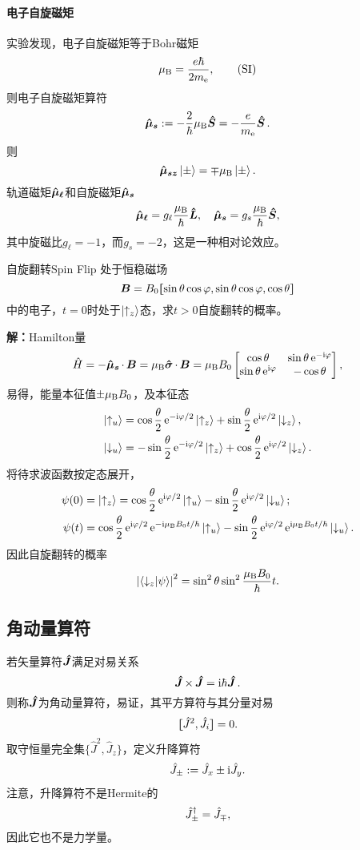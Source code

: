 \paragraph*{电子自旋磁矩}实验发现，电子自旋磁矩等于Bohr磁矩
\[
	\muB=\frac{e\hbar}{2m_\elc},\lSI
\]
则电子自旋磁矩算符
\[
	\qo{\mu_s}:=-\frac2\hbar\muB\qo S=-\frac e{m_\elc}\qo S.
\]
则
\[
	\qo{\mu_{sz}}\ket\pm=\mp\muB\ket\pm.
\]
轨道磁矩$\qo{\mu_\ell}$和自旋磁矩$\qo{\mu_s}$
\[
	\qo{\mu_\ell}=g_\ell\frac\muB\hbar\qo L,\quad\qo{\mu_s}=g_s\frac\muB\hbar\qo S,
\]
其中旋磁比$g_\ell=-1$，而$g_s=-2$，这是一种相对论效应。
\begin{example}{自旋翻转}{Spin Flip}
	处于恒稳磁场
	\[
		\bm B=B_0\zkh{\sin\theta\cos\vf,\sin\ct\cos\vf,\cos\ct}
\]
	中的电子，$t=0$时处于$\ket{\uparrow_z}$态，求$t>0$自旋翻转的概率。
	
	\textbf{解：}\quad Hamilton量
	\[
		\hat H=-\qo{\mu_s}\cdot\,\bm B=\muB\qo\sigma\cdot\,\bm B=\muB B_0\begin{bmatrix}
		\cos\ct&\sin\ct\e{-\i\vf}\\\sin\ct\e{\i\vf}&-\cos\ct
	\end{bmatrix},
\]
	易得，能量本征值$\pm\muB B_0$，及本征态
	\begin{align*}
		\ket{\uparrow_u}&=\cos\frac\ct{2}\e{-\i\vf/2}\ket{\uparrow_z}+\sin\frac\ct{2}\e{\i\vf/2}\ket{\downarrow_z},\\
		\ket{\downarrow_u}&=-\sin\frac\ct{2}\e{-\i\vf/2}\ket{\uparrow_z}+\cos\frac\ct{2}\e{\i\vf/2}\ket{\downarrow_z}.
	\end{align*}
	将待求波函数按定态展开，
	\begin{align*}
		\psi(0)&=\ket{\uparrow_z}=\cos\frac\ct{2}\e{\i\vf/2}\ket{\uparrow_u}-\sin\frac\theta{2}\e{\i\vf/2}\ket{\downarrow_u};\\
		\psi(t)&=\cos\frac\ct{2}\e{\i\vf/2}\e{-\i\muB B_0t/\hbar}\ket{\uparrow_u}-\sin\frac\theta{2}\e{\i\vf/2}\e{\i\muB B_0t/\hbar}\ket{\downarrow_u}.
	\end{align*}
	因此自旋翻转的概率
	\[
		\abs{\brkt{\downarrow_z}{\psi}}^2=\sin^2\theta\sin^2\frac{\muB B_0}\hbar t.
\]
\end{example}
\subsection{角动量算符}
若矢量算符$\qo J$满足对易关系
\[
	\qo J\times\,\qo J=\i\hbar\qo J.
\]
则称$\qo J$为角动量算符，易证，其平方算符与其分量对易
\[
	\cmm {J^2}{J_i}=0.
\]
取守恒量完全集$\{\hat J^2,\hat J_z\}$，定义升降算符
\begin{align}
	\hat J_\pm:=\hat J_x\pm\i\hat J_y.
\end{align}
注意，升降算符不是Hermite的
\[
	\hat J_\pm\dg=\hat J_\mp,
\]
因此它也不是力学量。

